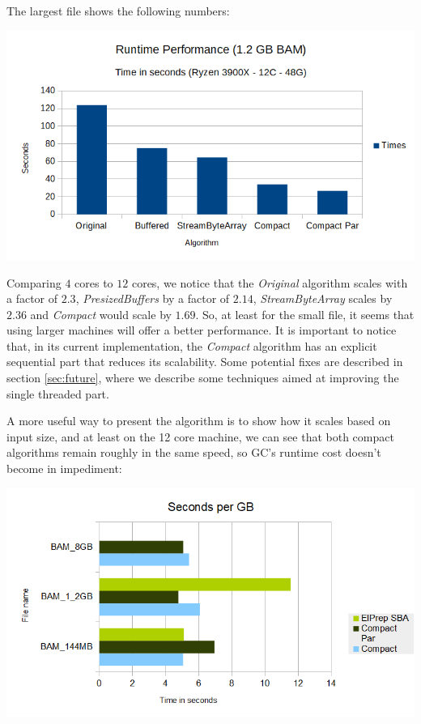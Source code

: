 \documentclass[a4paper,twoside]{article}
\begin{document}
The largest file shows the following numbers:
\begin{center}
	\includegraphics[scale=0.5]{images/runtime_perf_1_2G.png}
\end{center}

Comparing $4$ cores to $12$ cores, we notice that the {\textit{Original} } algorithm scales with a factor of $2.3$, {\textit{PresizedBuffers} } by a factor of $2.14$, {\textit{StreamByteArray} } scales by $2.36$ and {\textit{Compact} } would scale by $1.69$. So, at least for the small file, it seems that using larger machines will offer a better performance. It is important to notice that, in its current implementation, the {\textit{Compact} } algorithm has an explicit sequential part that reduces its scalability.
Some potential fixes are described in section \ref{sec:future}, where we describe some techniques aimed at improving the single threaded part.

A more useful way to present the algorithm is to show how it scales based on input size, and at least on the 12 core machine, we can see that both compact algorithms remain roughly in the same speed, so GC's runtime cost doesn't become in impediment:

\begin{center}
	\includegraphics[scale=0.5]{images/seconds_per_gb_ryzen.png}
\end{center}
\end{document}

